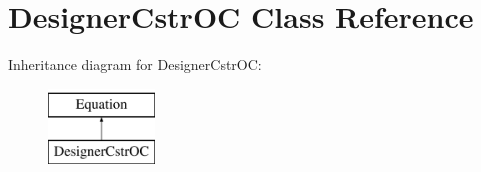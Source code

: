 \hypertarget{class_open_chams_1_1_designer_cstr_o_c}{}\section{Designer\+Cstr\+OC Class Reference}
\label{class_open_chams_1_1_designer_cstr_o_c}
Inheritance diagram for Designer\+Cstr\+OC\+:\begin{figure}[H]
\begin{center}
\leavevmode
\includegraphics[height=2.000000cm]{class_open_chams_1_1_designer_cstr_o_c}
\end{center}
\end{figure}
